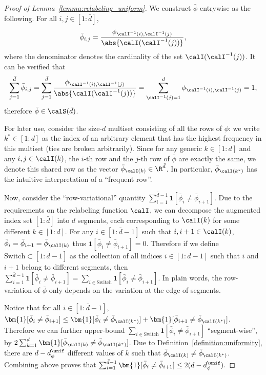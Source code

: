 \documentclass[10pt]{article}
\begin{document}
\begin{proof}[Proof of Lemma~\ref{lemma:relabeling_uniform}]
We construct $\bar\phi$ entrywise as the following. For all $i,j\in[1:\bar d]$,
\begin{equation*}
\bar\phi_{i,j}=\frac{\phi_{\calI^{-1}(i),\calI^{-1}(j)}}{\abs{\calI(\calI^{-1}(j))}},
\end{equation*}
where the denominator denotes the cardinality of the set $\calI(\calI^{-1}(j))$. It can be verified that
\begin{equation*}
\sum_{j=1}^{\bar d}\bar\phi_{i,j}=\sum_{j=1}^{\bar d}\frac{\phi_{\calI^{-1}(i),\calI^{-1}(j)}}{\abs{\calI(\calI^{-1}(j))}}=\sum_{\calI^{-1}(j)=1}^{d}\phi_{\calI^{-1}(i),\calI^{-1}(j)}=1,
\end{equation*}
therefore $\bar\phi\in\calS(\bar d)$. 

For later use, consider the size-$d$ multiset consisting of all the rows of $\phi$: we write $k^*\in[1:d]$ as the index of an arbitrary element that has the highest frequency in this multiset (ties are broken arbitrarily). Since for any generic $k\in[1:d]$ and any $i,j\in\calI(k)$, the $i$-th row and the $j$-th row of $\bar\phi$ are exactly the same, we denote this shared row as the vector $\bar\phi_{\calI(k)}\in\R^{\bar d}$. In particular, $\bar\phi_{\calI(k^*)}$ has the intuitive interpretation of a ``frequent row''. 

Now, consider the ``row-variational'' quantity $\sum_{i=1}^{\bar d-1}\bm{1}[\bar \phi_{i}\neq \bar \phi_{i+1}]$. Due to the requirements on the relabeling function $\calI$, we can decompose the augmented index set $[1:\bar d]$ into $d$ segments, each corresponding to $\calI(k)$ for some different $k\in[1:d]$. For any $i\in[1:\bar d-1]$ such that $i,i+1\in\calI(k)$, $\bar \phi_{i}=\bar \phi_{i+1}=\bar\phi_{\calI(k)}$ thus $\bm{1}[\bar \phi_{i}\neq \bar \phi_{i+1}]=0$. Therefore if we define $\mathrm{Switch}\subset[1:\bar d-1]$ as the collection of all indices $i\in[1:d-1]$ such that $i$ and $i+1$ belong to different segments, then $\sum_{i=1}^{\bar d-1}\bm{1}[\bar \phi_{i}\neq \bar \phi_{i+1}]=\sum_{i\in\mathrm{Switch}}\bm{1}[\bar \phi_{i}\neq \bar \phi_{i+1}]$. In plain words, the row-variation of $\bar\phi$ only depends on the variation at the edge of segments. 

Notice that for all $i\in[1:\bar d-1]$, $\bm{1}[\bar \phi_{i}\neq \bar \phi_{i+1}]\leq \bm{1}[\bar \phi_{i}\neq \bar\phi_{\calI(k^*)}]+\bm{1}[\bar \phi_{i+1}\neq \bar\phi_{\calI(k^*)}]$. Therefore we can further upper-bound $\sum_{i\in\mathrm{Switch}}\bm{1}[\bar \phi_{i}\neq \bar \phi_{i+1}]$ ``segment-wise'', by $2\sum_{k=1}^d\bm{1}[\bar \phi_{\calI(k)}\neq \bar \phi_{\calI(k^*)}]$. Due to Definition~\ref{definition:uniformity}, there are $d-d^\unif_\phi$ different values of $k$ such that $\bar \phi_{\calI(k)}\neq \bar \phi_{\calI(k^*)}$. Combining above proves that $\sum_{i=1}^{\bar d-1}\bm{1}[\bar \phi_{i}\neq \bar \phi_{i+1}]\leq 2 (d-d^\unif_\phi)$.


\end{proof}
\end{document}
